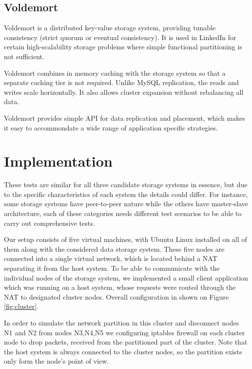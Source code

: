 \documentclass[a4paper]{article}
\begin{document}
\subsection{Voldemort}

Voldemort is a distributed key-value storage system, providing tunable consistency (strict quorum or eventual consistency). It is used in LinkedIn for certain 
high-scalability storage problems where simple functional partitioning is not sufficient. 

Voldemort combines in memory caching with the storage system so that a separate caching tier is not required. Unlike MySQL replication, the reads and writes scale horizontally. It also allows cluster expansion without rebalancing all data.

Voldemort provides simple API for data replication and placement, which makes it easy to accommondate a wide range of application specific strategies.


\section{Implementation}

These tests are similar for all three candidate storage systems in essence, but due to the specific characteristics of each system the details could differ. 
For instance, some storage systems have peer-to-peer nature while the others have master-slave architecture, each of these categories needs different test scenarios to be able to carry out comprehensive tests.

Our setup consists of five virtual machines, with Ubuntu Linux installed on all of them along with the considered data storage system. 
These five nodes are connected into a single virtual network, which is located behind a NAT separating it from the host system.
To be able to communicate with the individual nodes of the storage system, we implemented a small client application which was running on a host system, whose requests were routed through the NAT to designated cluster nodes. 
Overall configuration in shown on Figure \ref{fig:cluster}. 

In order to simulate the network partition in this cluster and disconnect nodes N1 and N2 from nodes N3,N4,N5 we configuring iptables firewall on each cluster node to drop packets, received from the partitioned part of the cluster.
Note that the host system is always connected to the cluster nodes, so the partition exists only form the node's point of view.
\end{document}
